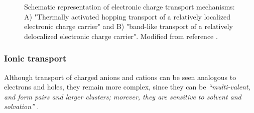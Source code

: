 

\begin{figure}[ht]
	\centering
	\caption{Schematic representation of electronic charge transport mechanisms: A) "Thermally activated hopping transport of a relatively localized electronic charge carrier" and B) "band-like transport of a relatively delocalized electronic charge carrier". Modified from reference \cite{paulsenOrganicMixedIonic2020}.}
	\label{fig:etrans}
\end{figure}


\subsubsection{Ionic transport}
Although transport of charged anions and cations can be seen analogous to electrons and holes, they remain more complex, since they can be \textit{``multi-valent, and form pairs and larger clusters; morever, they are sensitive to solvent and solvation''} \cite{paulsenOrganicMixedIonic2020}.

